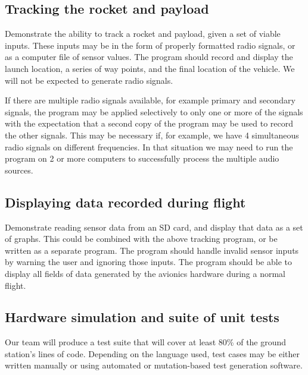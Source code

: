 \documentclass[onecolumn, draftclsnofoot,10pt, compsoc]{IEEEtran}
\begin{document}
\subsection{Tracking the rocket and payload}
Demonstrate the ability to track a rocket and payload, given a set of viable inputs.  These inputs may be in the form of properly formatted radio signals, or as a computer file of sensor values.  The program should record and display the launch location, a series of way points, and the final location of the vehicle.  We will not be expected to generate radio signals.

If there are multiple radio signals available, for example primary and secondary signals, the program may be applied selectively to only one or more of the signals with the expectation that a second copy of the program may be used to record the other signals.  This may be necessary if, for example, we have 4 simultaneous radio signals on different frequencies.  In that situation we may need to run the program on 2 or more computers to successfully process the multiple audio sources.

\subsection{Displaying data recorded during flight}
Demonstrate reading sensor data from an SD card, and display that data as a set of graphs.  This could be combined with the above tracking program, or be written as a separate program.  The program should handle invalid sensor inputs by warning the user and ignoring those inputs.  The program should be able to display all fields of data generated by the avionics hardware during a normal flight.

\subsection{Hardware simulation and suite of unit tests}
Our team will produce a test suite that will cover at least 80\% of the ground station's lines of code.  Depending on the language used, test cases may be either written manually or using automated or mutation-based test generation software.
\end{document}
